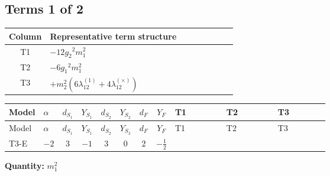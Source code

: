 \documentclass[8pt]{article}
\begin{document}
\begin{landscape}
\subsection*{Terms 1 of 2}
\begin{center}
\begin{tabular}{@{}c >{\raggedright\arraybackslash}p{0.82\linewidth}@{}}
\toprule
Column & Representative term structure \\
\midrule
T1 & \(\displaystyle -12 {g_2}^2 {m_1^2}\) \\
\midrule
T2 & \(\displaystyle -6 {g_1}^2 {m_1^2}\) \\
\midrule
T3 & \(\displaystyle +{m_2^2} (6 {\lambda_{12}^{(1)}}+4 {\lambda_{12}^{(\times)}})\) \\
\midrule
\bottomrule
\end{tabular}
\end{center}
\smallskip
\tiny
\begin{longtable}{@{}llcccccc >{\raggedright\arraybackslash}p{0.21\linewidth} >{\raggedright\arraybackslash}p{0.21\linewidth} >{\raggedright\arraybackslash}p{0.21\linewidth}@{}}
\toprule
Model & $\alpha$ & $d_{S_1}$ & $Y_{S_1}$ & $d_{S_2}$ & $Y_{S_2}$ & $d_F$ & $Y_F$ & T1 & T2 & T3 \\
\midrule
\endfirsthead
\toprule
Model & $\alpha$ & $d_{S_1}$ & $Y_{S_1}$ & $d_{S_2}$ & $Y_{S_2}$ & $d_F$ & $Y_F$ & T1 & T2 & T3 \\
\midrule
\endhead
T3-E & $-2$ & $3$ & $-1$ & $3$ & $0$ & $2$ & $-\frac{1}{2}$ & \scriptsize\adjustbox{max width=\linewidth}{$\begin{gathered} -12 {g_2}^2 {m_1^2}\end{gathered}$} & \scriptsize\adjustbox{max width=\linewidth}{$\begin{gathered} -6 {g_1}^2 {m_1^2}\end{gathered}$} & \scriptsize\adjustbox{max width=\linewidth}{$\begin{gathered} +{m_2^2} (6 {\lambda_{12}^{(1)}}+4 {\lambda_{12}^{(\times)}})\end{gathered}$} \\
\midrule
\bottomrule
\end{longtable}
\clearpage
\noindent\textbf{Quantity: }$m_1^2$\par\smallskip

\end{landscape}
\end{document}
